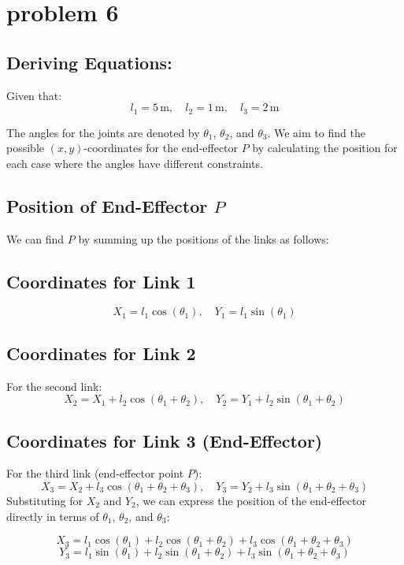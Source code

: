 \documentclass[12pt]{article}
\begin{document}
\clearpage  %


\section{problem 6}
\subsection*{Deriving Equations:}

Given that:
\[
l_1 = 5 \, \text{m}, \quad l_2 = 1 \, \text{m}, \quad l_3 = 2 \, \text{m}
\]

The angles for the joints are denoted by \( \theta_1 \), \( \theta_2 \), and \( \theta_3 \). We aim to find the possible \( (x, y) \)-coordinates for the end-effector \( P \) by calculating the position for each case where the angles have different constraints.

\subsection*{Position of End-Effector \( P \)}

We can find \( P \) by summing up the positions of the links as follows:

\subsection*{Coordinates for Link 1}
\[
X_1 = l_1 \cos(\theta_1), \quad Y_1 = l_1 \sin(\theta_1)
\]

\subsection*{Coordinates for Link 2}
For the second link:
\[
X_2 = X_1 + l_2 \cos(\theta_1 + \theta_2), \quad Y_2 = Y_1 + l_2 \sin(\theta_1 + \theta_2)
\]

\subsection*{Coordinates for Link 3 (End-Effector)}
For the third link (end-effector point \( P \)):
\[
X_3 = X_2 + l_3 \cos(\theta_1 + \theta_2 + \theta_3), \quad Y_3 = Y_2 + l_3 \sin(\theta_1 + \theta_2 + \theta_3)
\]
Substituting for \( X_2 \) and \( Y_2 \), we can express the position of the end-effector directly in terms of \( \theta_1 \), \( \theta_2 \), and \( \theta_3 \):

\[
X_3 = l_1 \cos(\theta_1) + l_2 \cos(\theta_1 + \theta_2) + l_3 \cos(\theta_1 + \theta_2 + \theta_3)
\]
\[
Y_3 = l_1 \sin(\theta_1) + l_2 \sin(\theta_1 + \theta_2) + l_3 \sin(\theta_1 + \theta_2 + \theta_3)
\]
\end{document}
